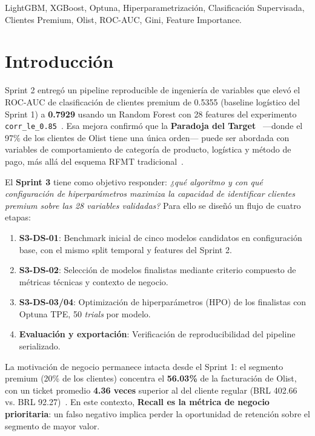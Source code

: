 \documentclass[journal,letterpaper]{IEEEtran}
\begin{document}
\begin{IEEEkeywords}
LightGBM, XGBoost, Optuna, Hiperparametrización, Clasificación Supervisada, Clientes Premium, Olist, ROC-AUC, Gini, Feature Importance.
\end{IEEEkeywords}

\section{Introducción}
 Sprint 2 entregó un pipeline reproducible de ingeniería de variables que elevó el ROC-AUC de clasificación de clientes premium de 0.5355 (baseline logístico del Sprint 1) a \textbf{0.7929} usando un Random Forest con 28 features del experimento \texttt{corr\_le\_0.85}~\cite{sprint2_report}. Esa mejora confirmó que la \textbf{Paradoja del Target}~\cite{sprint1_report} —donde el 97\% de los clientes de Olist tiene una única orden— puede ser abordada con variables de comportamiento de categoría de producto, logística y método de pago, más allá del esquema RFMT tradicional~\cite{rfmt_methodology}.

El \textbf{Sprint 3} tiene como objetivo responder: \textit{¿qué algoritmo y con qué configuración de hiperparámetros maximiza la capacidad de identificar clientes premium sobre las 28 variables validadas?} Para ello se diseñó un flujo de cuatro etapas:

\begin{enumerate}
    \item \textbf{S3-DS-01}: Benchmark inicial de cinco modelos candidatos en configuración base, con el mismo split temporal y features del Sprint 2.
    \item \textbf{S3-DS-02}: Selección de modelos finalistas mediante criterio compuesto de métricas técnicas y contexto de negocio.
    \item \textbf{S3-DS-03/04}: Optimización de hiperparámetros (HPO) de los finalistas con Optuna TPE, 50 \textit{trials} por modelo.
    \item \textbf{Evaluación y exportación}: Verificación de reproducibilidad del pipeline serializado.
\end{enumerate}

La motivación de negocio permanece intacta desde el Sprint 1: el segmento premium (20\% de los clientes) concentra el \textbf{56.03\%} de la facturación de Olist, con un ticket promedio \textbf{4.36 veces} superior al del cliente regular (BRL 402.66 vs. BRL 92.27)~\cite{sprint2_report}. En este contexto, \textbf{Recall es la métrica de negocio prioritaria}: un falso negativo implica perder la oportunidad de retención sobre el segmento de mayor valor.
\end{document}
